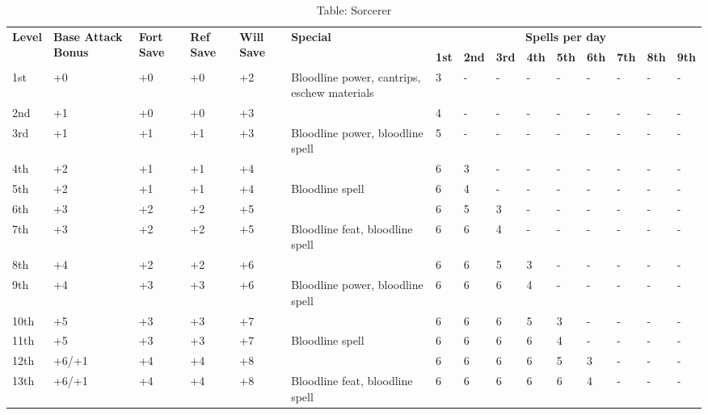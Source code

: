 \begin{table*}[]
\caption{Table: Sorcerer}
\sffamily
\setlength{\tabcolsep}{1pt}
\begin{tabularx}{\linewidth}{lp{6em}p{2.5em}p{2.5em}p{2.5em}Xlllllllll}
\multirow{2}{*}{\textbf{Level}} & \multirow{2}{*}{\parbox{5em}{\textbf{Base Attack Bonus}}} & \multirow{2}{*}{\parbox{1.5em}{\textbf{Fort Save}}} & \multirow{2}{*}{\parbox{1.5em}{\textbf{Ref Save}}} & \multirow{2}{*}{\parbox{1.5em}{\textbf{Will Save}}} & \textbf{Special}      & \multicolumn{9}{c}{\textbf{Spells per day}} \\
                       &                                    &                            &                           &                            &                                                                                                  & \textbf{1st} & \textbf{2nd} & \textbf{3rd} & \textbf{4th} & \textbf{5th} & \textbf{6th} & \textbf{7th} & \textbf{8th} & \textbf{9th} \\
\hline
1st & +0 & +0 & +0 & +2 & Bloodline power, cantrips, eschew materials & 3 & - & - & - & - & - & - & - & -\\
2nd & +1 & +0 & +0 & +3 &  & 4 & - & - & - & - & - & - & - & -\\
3rd & +1 & +1 & +1 & +3 & Bloodline power, bloodline spell & 5 & - & - & - & - & - & - & - & -\\
4th & +2 & +1 & +1 & +4 &  & 6 & 3 & - & - & - & - & - & - & -\\
5th & +2 & +1 & +1 & +4 & Bloodline spell & 6 & 4 & - & - & - & - & - & - & -\\
6th & +3 & +2 & +2 & +5 &  & 6 & 5 & 3 & - & - & - & - & - & -\\
7th & +3 & +2 & +2 & +5 & Bloodline feat, bloodline spell & 6 & 6 & 4 & - & - & - & - & - & -\\
8th & +4 & +2 & +2 & +6 &  & 6 & 6 & 5 & 3 & - & - & - & - & -\\
9th & +4 & +3 & +3 & +6 & Bloodline power, bloodline spell & 6 & 6 & 6 & 4 & - & - & - & - & -\\
10th & +5 & +3 & +3 & +7 &  & 6 & 6 & 6 & 5 & 3 & - & - & - & -\\
11th & +5 & +3 & +3 & +7 & Bloodline spell & 6 & 6 & 6 & 6 & 4 & - & - & - & -\\
12th & +6/+1 & +4 & +4 & +8 &  & 6 & 6 & 6 & 6 & 5 & 3 & - & - & -\\
13th & +6/+1 & +4 & +4 & +8 & Bloodline feat, bloodline spell & 6 & 6 & 6 & 6 & 6 & 4 & - & - & -\\

\end{tabularx}
\end{table*}
